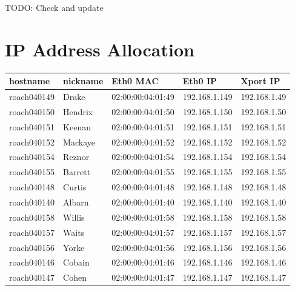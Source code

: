 \documentclass[letterpaper,10pt,english]{sphinxmanual}
\begin{document}
TODO: Check and update


\section{IP Address Allocation}
\label{ip_allocation:ip-address-allocation}
\begin{tabulary}{\linewidth}{|L|L|L|L|L|}
\hline
\textbf{
hostname
} & \textbf{
nickname
} & \textbf{
Eth0 MAC
} & \textbf{
Eth0 IP
} & \textbf{
Xport IP
}\\\hline

roach040149
 & 
Drake
 & 
02:00:00:04:01:49
 & 
192.168.1.149
 & 
192.168.1.49
\\\hline

roach040150
 & 
Hendrix
 & 
02:00:00:04:01:50
 & 
192.168.1.150
 & 
192.168.1.50
\\\hline

roach040151
 & 
Keenan
 & 
02:00:00:04:01:51
 & 
192.168.1.151
 & 
192.168.1.51
\\\hline

roach040152
 & 
Mackaye
 & 
02:00:00:04:01:52
 & 
192.168.1.152
 & 
192.168.1.52
\\\hline

roach040154
 & 
Reznor
 & 
02:00:00:04:01:54
 & 
192.168.1.154
 & 
192.168.1.54
\\\hline

roach040155
 & 
Barrett
 & 
02:00:00:04:01:55
 & 
192.168.1.155
 & 
192.168.1.55
\\\hline

roach040148
 & 
Curtis
 & 
02:00:00:04:01:48
 & 
192.168.1.148
 & 
192.168.1.48
\\\hline

roach040140
 & 
Albarn
 & 
02:00:00:04:01:40
 & 
192.168.1.140
 & 
192.168.1.40
\\\hline

roach040158
 & 
Willis
 & 
02:00:00:04:01:58
 & 
192.168.1.158
 & 
192.168.1.58
\\\hline

roach040157
 & 
Waits
 & 
02:00:00:04:01:57
 & 
192.168.1.157
 & 
192.168.1.57
\\\hline

roach040156
 & 
Yorke
 & 
02:00:00:04:01:56
 & 
192.168.1.156
 & 
192.168.1.56
\\\hline

roach040146
 & 
Cobain
 & 
02:00:00:04:01:46
 & 
192.168.1.146
 & 
192.168.1.46
\\\hline

roach040147
 & 
Cohen
 & 
02:00:00:04:01:47
 & 
192.168.1.147
 & 
192.168.1.47
\\\hline
\end{tabulary}
\end{document}
